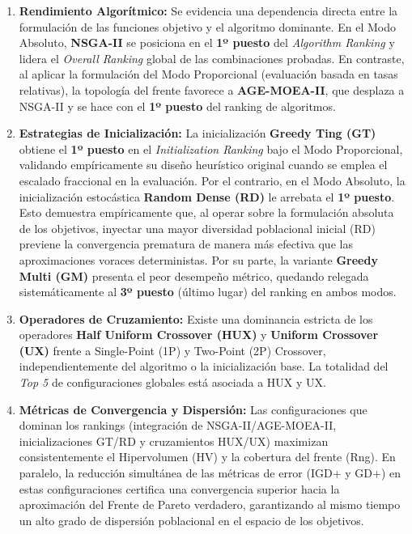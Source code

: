 \documentclass[11pt,a4paper]{article}
\begin{document}
\begin{enumerate}
    \item \textbf{Rendimiento Algorítmico:} Se evidencia una dependencia directa entre la formulación de las funciones objetivo y el algoritmo dominante. En el Modo Absoluto, \textbf{NSGA-II} se posiciona en el \textbf{1º puesto} del \textit{Algorithm Ranking} y lidera el \textit{Overall Ranking} global de las combinaciones probadas. En contraste, al aplicar la formulación del Modo Proporcional (evaluación basada en tasas relativas), la topología del frente favorece a \textbf{AGE-MOEA-II}, que desplaza a NSGA-II y se hace con el \textbf{1º puesto} del ranking de algoritmos.

    \item \textbf{Estrategias de Inicialización:} La inicialización \textbf{Greedy Ting (GT)} obtiene el \textbf{1º puesto} en el \textit{Initialization Ranking} bajo el Modo Proporcional, validando empíricamente su diseño heurístico original cuando se emplea el escalado fraccional en la evaluación. Por el contrario, en el Modo Absoluto, la inicialización estocástica \textbf{Random Dense (RD)} le arrebata el \textbf{1º puesto}. Esto demuestra empíricamente que, al operar sobre la formulación absoluta de los objetivos, inyectar una mayor diversidad poblacional inicial (RD) previene la convergencia prematura de manera más efectiva que las aproximaciones voraces deterministas. Por su parte, la variante \textbf{Greedy Multi (GM)} presenta el peor desempeño métrico, quedando relegada sistemáticamente al \textbf{3º puesto} (último lugar) del ranking en ambos modos.

    \item \textbf{Operadores de Cruzamiento:} Existe una dominancia estricta de los operadores \textbf{Half Uniform Crossover (HUX)} y \textbf{Uniform Crossover (UX)} frente a Single-Point (1P) y Two-Point (2P) Crossover, independientemente del algoritmo o la inicialización base. La totalidad del \textit{Top 5} de configuraciones globales está asociada a HUX y UX.

    \item \textbf{Métricas de Convergencia y Dispersión:} Las configuraciones que dominan los rankings (integración de NSGA-II/AGE-MOEA-II, inicializaciones GT/RD y cruzamientos HUX/UX) maximizan consistentemente el Hipervolumen (HV) y la cobertura del frente (Rng). En paralelo, la reducción simultánea de las métricas de error (IGD+ y GD+) en estas configuraciones certifica una convergencia superior hacia la aproximación del Frente de Pareto verdadero, garantizando al mismo tiempo un alto grado de dispersión poblacional en el espacio de los objetivos.
\end{enumerate}
\end{document}
